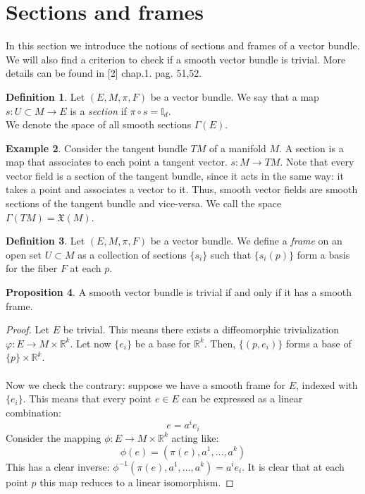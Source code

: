 \documentclass[12pt,a4paper]{report}
\theoremstyle{definition}
\newtheorem{Def}{Definition}[chapter]
\theoremstyle{Theorem}
\newtheorem{Prop}[Def]{Proposition}
\theoremstyle{definition}
\newtheorem{Ex}[Def]{Example}
\theoremstyle{definition}
\begin{document}
	\section{Sections and frames}
	In this section we introduce the notions of sections and frames of a vector bundle. We will also find a criterion to check if a smooth vector bundle is trivial. More details can be found in [2] chap.1. pag. 51,52.
	\begin{Def}\label{Def_5.5}
		Let $(E,M,\pi,F)$ be a vector bundle. We say that a map \\$s:U\subset M\rightarrow E$ is a \textit{section} if $\pi\circ s=\mathbb{I}_d$. \\
		We denote the space of all smooth sections $\Gamma(E)$.
	\end{Def}
	\begin{Ex}
		Consider the tangent bundle $TM$ of a manifold $M$. A section is a map that associates to each point a tangent vector. $s:M\rightarrow TM$. Note that every vector field is a section of the tangent bundle, since it acts in the same way: it takes a point and associates a vector to it. Thus, smooth vector fields are smooth sections of the tangent bundle and vice-versa. We call the space $\Gamma(TM)=\mathfrak{X}(M)$.
	\end{Ex}
	\begin{Def}\label{Def_5.6}
		Let $(E,M,\pi,F)$ be a vector bundle. We define a \textit{frame} on an open set $U\subset M$ as a collection of sections $\{s_i\}$ such that $\{s_i(p)\}$ form a basis for the fiber $F$ at each $p$. 
	\end{Def}
	\begin{Prop}\label{prop_2.3.1}
		A smooth vector bundle is trivial if and only if it has a smooth frame.
	\end{Prop}
	\begin{proof}
		Let $E$ be trivial. This means there exists a diffeomorphic trivialization $\varphi:E\rightarrow M\times \mathbb{R}^k$. Let now $\{e_i\}$ be a base for $\mathbb{R}^k$. Then, $\{(p,e_i)\}$ forms a base of $\{p\}\times \mathbb{R}^k$.
		\\\\
		Now we check the contrary: suppose we have a smooth frame for $E$, indexed with $\{e_i\}$. This means that every point $e\in E$ can be expressed as a linear combination:
		$$e=a^ie_i$$
		Consider the mapping $\phi:E\rightarrow M\times\mathbb{R}^k$ acting like:
		$$\phi(e)=(\pi(e),a^1,...,a^k)$$
		This has a clear inverse: $\phi^{-1}(\pi(e),a^1,...,a^k)=a^ie_i$.
		It is clear that at each point $p$ this map reduces to a linear isomorphism.
	\end{proof}
\end{document}
